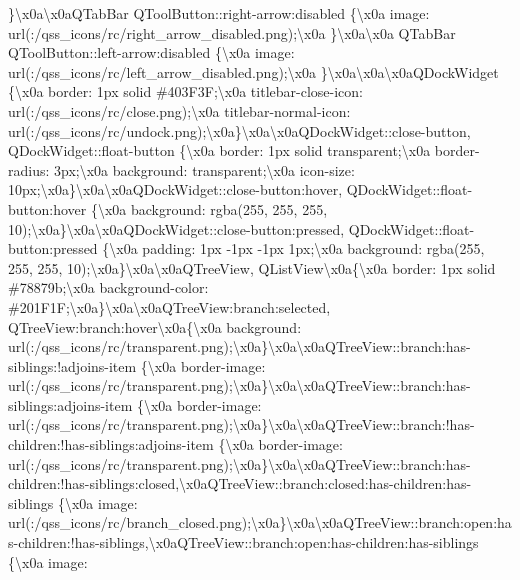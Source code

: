 \begin{DoxyCompactItemize}
\}\textbackslash{}x0a\textbackslash{}x0a\+Q\+Tab\+Bar Q\+Tool\+Button\+::right-\/arrow\+:disabled \{\textbackslash{}x0a image\+: url(\+:/qss\+\_\+icons/rc/right\+\_\+arrow\+\_\+disabled.\+png);\textbackslash{}x0a \}\textbackslash{}x0a\textbackslash{}x0a Q\+Tab\+Bar Q\+Tool\+Button\+::left-\/arrow\+:disabled \{\textbackslash{}x0a image\+: url(\+:/qss\+\_\+icons/rc/left\+\_\+arrow\+\_\+disabled.\+png);\textbackslash{}x0a \}\textbackslash{}x0a\textbackslash{}x0a\textbackslash{}x0a\+Q\+Dock\+Widget \{\textbackslash{}x0a border\+: 1px solid \#403\+F3\+F;\textbackslash{}x0a titlebar-\/close-\/icon\+: url(\+:/qss\+\_\+icons/rc/close.\+png);\textbackslash{}x0a titlebar-\/normal-\/icon\+: url(\+:/qss\+\_\+icons/rc/undock.\+png);\textbackslash{}x0a\}\textbackslash{}x0a\textbackslash{}x0a\+Q\+Dock\+Widget\+::close-\/button, Q\+Dock\+Widget\+::float-\/button \{\textbackslash{}x0a border\+: 1px solid transparent;\textbackslash{}x0a border-\/radius\+: 3px;\textbackslash{}x0a background\+: transparent;\textbackslash{}x0a icon-\/size\+: 10px;\textbackslash{}x0a\}\textbackslash{}x0a\textbackslash{}x0a\+Q\+Dock\+Widget\+::close-\/button\+:hover, Q\+Dock\+Widget\+::float-\/button\+:hover \{\textbackslash{}x0a background\+: rgba(255, 255, 255, 10);\textbackslash{}x0a\}\textbackslash{}x0a\textbackslash{}x0a\+Q\+Dock\+Widget\+::close-\/button\+:pressed, Q\+Dock\+Widget\+::float-\/button\+:pressed \{\textbackslash{}x0a padding\+: 1px -\/1px -\/1px 1px;\textbackslash{}x0a background\+: rgba(255, 255, 255, 10);\textbackslash{}x0a\}\textbackslash{}x0a\textbackslash{}x0a\+Q\+Tree\+View, Q\+List\+View\textbackslash{}x0a\{\textbackslash{}x0a border\+: 1px solid \#78879b;\textbackslash{}x0a background-\/color\+: \#201\+F1\+F;\textbackslash{}x0a\}\textbackslash{}x0a\textbackslash{}x0a\+Q\+Tree\+View\+:branch\+:selected, Q\+Tree\+View\+:branch\+:hover\textbackslash{}x0a\{\textbackslash{}x0a background\+: url(\+:/qss\+\_\+icons/rc/transparent.\+png);\textbackslash{}x0a\}\textbackslash{}x0a\textbackslash{}x0a\+Q\+Tree\+View\+::branch\+:has-\/siblings\+:!adjoins-\/item \{\textbackslash{}x0a border-\/image\+: url(\+:/qss\+\_\+icons/rc/transparent.\+png);\textbackslash{}x0a\}\textbackslash{}x0a\textbackslash{}x0a\+Q\+Tree\+View\+::branch\+:has-\/siblings\+:adjoins-\/item \{\textbackslash{}x0a border-\/image\+: url(\+:/qss\+\_\+icons/rc/transparent.\+png);\textbackslash{}x0a\}\textbackslash{}x0a\textbackslash{}x0a\+Q\+Tree\+View\+::branch\+:!has-\/children\+:!has-\/siblings\+:adjoins-\/item \{\textbackslash{}x0a border-\/image\+: url(\+:/qss\+\_\+icons/rc/transparent.\+png);\textbackslash{}x0a\}\textbackslash{}x0a\textbackslash{}x0a\+Q\+Tree\+View\+::branch\+:has-\/children\+:!has-\/siblings\+:closed,\textbackslash{}x0a\+Q\+Tree\+View\+::branch\+:closed\+:has-\/children\+:has-\/siblings \{\textbackslash{}x0a image\+: url(\+:/qss\+\_\+icons/rc/branch\+\_\+closed.\+png);\textbackslash{}x0a\}\textbackslash{}x0a\textbackslash{}x0a\+Q\+Tree\+View\+::branch\+:open\+:has-\/children\+:!has-\/siblings,\textbackslash{}x0a\+Q\+Tree\+View\+::branch\+:open\+:has-\/children\+:has-\/siblings \{\textbackslash{}x0a image\+: 
\end{DoxyCompactItemize}
